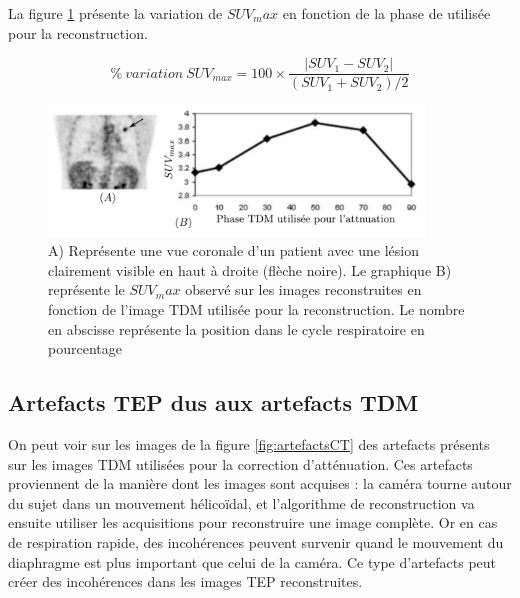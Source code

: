 La figure \ref{fig:lesionEnFctPhaseTDM} présente la variation de $SUV_max$ en fonction de la phase de utilisée pour la reconstruction.

\begin{equation}
\label{eq:varSUV}
 \%~variation~SUV_{max} = 100 \times \frac{ | SUV_1 - SUV_2 | }{ (SUV_1 + SUV_2) / 2 }
\end{equation}

\begin{figure}[h!]
	\vspace{0.5cm}
	\centering
			\includegraphics[width=10cm]{images/lesionEnFctPhaseTDM}
	\vspace{-0.5cm}
	\caption{A) Représente une vue coronale d'un patient avec une lésion clairement visible en haut à droite (flèche noire). Le graphique B) représente le $SUV_max$ observé sur les images reconstruites en fonction de l'image TDM utilisée pour la reconstruction. Le nombre en abscisse représente la position dans le cycle respiratoire en pourcentage} 
	\label{fig:lesionEnFctPhaseTDM}
\end{figure}

\subsection{Artefacts TEP dus aux artefacts TDM}

On peut voir sur les images de la figure \ref{fig:artefactsCT} des artefacts présents sur les images TDM utilisées pour la correction d'atténuation. Ces artefacts proviennent de la manière dont les images sont acquises : la caméra tourne autour du sujet dans un mouvement hélicoïdal, et l'algorithme de reconstruction va ensuite utiliser les acquisitions pour reconstruire une image complète. Or en cas de respiration rapide, des incohérences peuvent survenir quand le mouvement du diaphragme est plus important que celui de la caméra. Ce type d'artefacts peut créer des incohérences dans les images TEP reconstruites.

